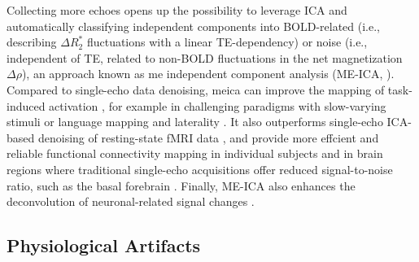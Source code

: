 Collecting more echoes opens up the possibility to leverage ICA and
automatically classifying independent components into BOLD-related (i.e.,
describing $\Delta R_2^*$ fluctuations with a linear TE-dependency) or noise
(i.e., independent of TE, related to non-BOLD fluctuations in the net
magnetization $\Delta \rho$), an approach known as \acrshort*{me} independent
component analysis (ME-ICA,
\cite{Kundu2013Integratedstrategyimproving,Kundu2012DifferentiatingBOLDnon,Kundu2017MultiechofMRI}).
Compared to single-echo data denoising, \acrshort*{meica} can improve the
mapping of task-induced activation
\citep{DuPre2021TEdependentanalysis,GonzalezCastillo2016Evaluationmultiecho,Lombardo2016Improvingeffectsize},
for example in challenging paradigms with slow-varying stimuli
\citep{Evans2015SeparatingslowBOLD} or language mapping and laterality
\citep{Amemiya2018Integratedmultiecho}. It also outperforms single-echo
ICA-based denoising of resting-state fMRI data
\citep{Dipasquale2017Comparingrestingstate,Lynch2020RapidPrecisionFunctional},
and provide more effcient and reliable functional connectivity mapping in
individual subjects \citep{Lynch2020RapidPrecisionFunctional} and in brain
regions where traditional single-echo acquisitions offer reduced signal-to-noise
ratio, such as the basal forebrain \citep{Markello2018Segregationhumanbasal}.
Finally, ME-ICA also enhances the deconvolution of neuronal-related signal
changes \citep{CaballeroGaudes2019deconvolutionalgorithmmulti}.

\subsection{Physiological Artifacts}

